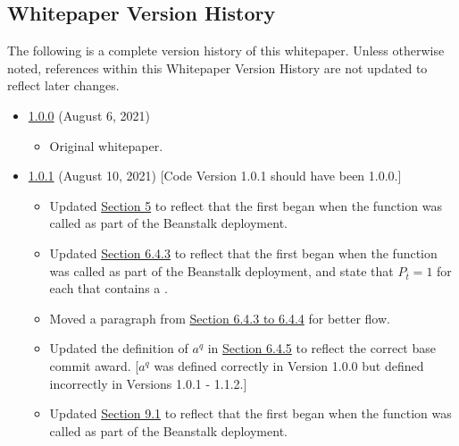 \documentclass[class=article, crop=false]{standalone}
\begin{document}

\subsection{Whitepaper Version History}

The following is a complete version history of this whitepaper. Unless otherwise noted, references within this Whitepaper Version History are not updated to reflect later changes.

\begin{itemize}[topsep=0pt, itemsep=3pt,leftmargin=16pt]
    \item \href{https://github.com/BeanstalkFarms/Beanstalk-Whitepaper/blob/master/version-history/beanstalk1_0_0.pdf}{1.0.0} (August 6, 2021)
    
    \begin{itemize}
        \item Original whitepaper.
    \end{itemize}
    
    \item \href{https://github.com/BeanstalkFarms/Beanstalk-Whitepaper/blob/master/version-history/beanstalk1_0_1.pdf}{1.0.1} (August 10, 2021) [Code Version 1.0.1 should have been 1.0.0.]
    
    \begin{itemize}
        \item Updated \hyperlink{section.5}{Section 5} to reflect that the first  began when the  function was called as part of the Beanstalk deployment.
        \item Updated \hyperlink{subsubsection.6.4.3}{Section 6.4.3} to reflect that the first  began when the  function was called as part of the Beanstalk deployment, and state that $P_{\overline{t}} = 1$ for each  that contains a .
        \item Moved a paragraph from \hyperlink{subsubsection.6.4.3}{Section 6.4.3 to 6.4.4} for better flow.
        \item Updated the definition of $a^q$ in \hyperlink{subsubsection.6.4.5}{Section 6.4.5} to reflect the correct base commit award. [$a^q$ was defined correctly in Version 1.0.0 but defined incorrectly in Versions 1.0.1 - 1.1.2.]
        \item Updated \hyperlink{subsection.9.1}{Section 9.1} to reflect that the first  began when the  function was called as part of the Beanstalk deployment.
    \end{itemize}
    

\end{itemize}
\end{document}
